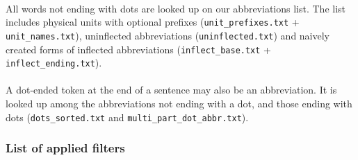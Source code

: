 \documentclass[oneside,12pt]{article}
\begin{document}
\paragraph{}
All words not ending with dots are looked up on our abbreviations list. The list includes physical units with optional prefixes (\texttt{unit\_prefixes.txt} + \texttt{unit\_names.txt}), uninflected abbreviations (\texttt{uninflected.txt}) and naively created forms of inflected abbreviations (\texttt{inflect\_base.txt} + \texttt{inflect\_ending.txt}).

\paragraph{}
A dot-ended token at the end of a sentence may also be an abbreviation. It is looked up among the abbreviations not ending with a dot, and those ending with dots (\texttt{dots\_sorted.txt} and \texttt{multi\_part\_dot\_abbr.txt}).

\subsubsection{List of applied filters}
\end{document}
